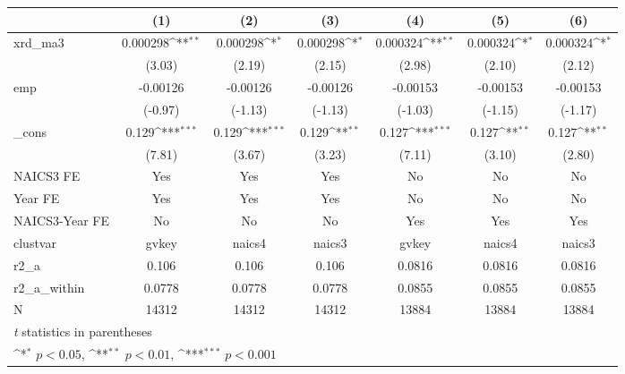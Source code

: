{
\def\sym#1{\ifmmode^{#1}\else\(^{#1}\)\fi}
\begin{tabular}{l*{6}{c}}
\hline\hline
            &\multicolumn{1}{c}{(1)}         &\multicolumn{1}{c}{(2)}         &\multicolumn{1}{c}{(3)}         &\multicolumn{1}{c}{(4)}         &\multicolumn{1}{c}{(5)}         &\multicolumn{1}{c}{(6)}         \\
\hline
xrd\_ma3     &    0.000298\sym{**} &    0.000298\sym{*}  &    0.000298\sym{*}  &    0.000324\sym{**} &    0.000324\sym{*}  &    0.000324\sym{*}  \\
            &      (3.03)         &      (2.19)         &      (2.15)         &      (2.98)         &      (2.10)         &      (2.12)         \\
[1em]
emp         &    -0.00126         &    -0.00126         &    -0.00126         &    -0.00153         &    -0.00153         &    -0.00153         \\
            &     (-0.97)         &     (-1.13)         &     (-1.13)         &     (-1.03)         &     (-1.15)         &     (-1.17)         \\
[1em]
\_cons      &       0.129\sym{***}&       0.129\sym{***}&       0.129\sym{**} &       0.127\sym{***}&       0.127\sym{**} &       0.127\sym{**} \\
            &      (7.81)         &      (3.67)         &      (3.23)         &      (7.11)         &      (3.10)         &      (2.80)         \\
[1em]
NAICS3 FE   &         Yes         &         Yes         &         Yes         &          No         &          No         &          No         \\
[1em]
Year FE     &         Yes         &         Yes         &         Yes         &          No         &          No         &          No         \\
[1em]
NAICS3-Year FE&          No         &          No         &          No         &         Yes         &         Yes         &         Yes         \\
\hline
clustvar    &       gvkey         &      naics4         &      naics3         &       gvkey         &      naics4         &      naics3         \\
r2\_a        &       0.106         &       0.106         &       0.106         &      0.0816         &      0.0816         &      0.0816         \\
r2\_a\_within &      0.0778         &      0.0778         &      0.0778         &      0.0855         &      0.0855         &      0.0855         \\
N           &       14312         &       14312         &       14312         &       13884         &       13884         &       13884         \\
\hline\hline
\multicolumn{7}{l}{\footnotesize \textit{t} statistics in parentheses}\\
\multicolumn{7}{l}{\footnotesize \sym{*} \(p<0.05\), \sym{**} \(p<0.01\), \sym{***} \(p<0.001\)}\\
\end{tabular}
}

